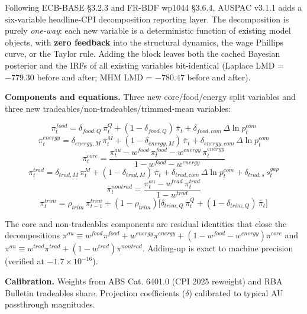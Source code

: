 \documentclass[
]{article}
\begin{document}
Following ECB-BASE §3.2.3 and FR-BDF wp1044 §3.6.4, AUSPAC v3.1.1 adds a
six-variable headline-CPI decomposition reporting layer. The
decomposition is purely \emph{one-way}: each new variable is a
deterministic function of existing model objects, with \textbf{zero
feedback} into the structural dynamics, the wage Phillips curve, or the
Taylor rule. Adding the block leaves both the cached Bayesian posterior
and the IRFs of all existing variables bit-identical (Laplace LMD =
\(-779.30\) before and after; MHM LMD = \(-780.47\) before and after).

\textbf{Components and equations.} Three new core/food/energy split
variables and three new tradeables/non-tradeables/trimmed-mean
variables:

\[\pi^{food}_t = \delta_{food,Q}\,\pi^Q_t + (1-\delta_{food,Q})\,\bar{\pi}_t + \delta_{food,com}\,\Delta\ln p^{com}_t\]
\[\pi^{energy}_t = \delta_{energy,M}\,\pi^M_t + (1-\delta_{energy,M})\,\bar{\pi}_t + \delta_{energy,com}\,\Delta\ln p^{com}_t\]
\[\pi^{core}_t = \frac{\pi^{au}_t - w^{food}\,\pi^{food}_t - w^{energy}\,\pi^{energy}_t}{1 - w^{food} - w^{energy}}\]
\[\pi^{trad}_t = \delta_{trad,M}\,\pi^M_t + (1-\delta_{trad,M})\,\bar{\pi}_t + \delta_{trad,com}\,\Delta\ln p^{com}_t + \delta_{trad,s}\,s^{gap}_t\]
\[\pi^{nontrad}_t = \frac{\pi^{au}_t - w^{trad}\,\pi^{trad}_t}{1 - w^{trad}}\]
\[\pi^{trim}_t = \rho_{trim}\,\pi^{trim}_{t-1} + (1-\rho_{trim})\bigl[\delta_{trim,Q}\,\pi^Q_t + (1-\delta_{trim,Q})\,\bar{\pi}_t\bigr]\]

The core and non-tradeables components are residual identities that
close the decompositions
\(\pi^{au} \equiv w^{food}\pi^{food} + w^{energy}\pi^{energy} + (1{-}w^{food}{-}w^{energy})\pi^{core}\)
and
\(\pi^{au} \equiv w^{trad}\pi^{trad} + (1{-}w^{trad})\pi^{nontrad}\).
Adding-up is exact to machine precision (verified at
\(-1.7 \times 10^{-16}\)).

\textbf{Calibration.} Weights from ABS Cat. 6401.0 (CPI 2025 reweight)
and RBA Bulletin tradeables share. Projection coefficients (\(\delta\))
calibrated to typical AU passthrough magnitudes.
\end{document}
